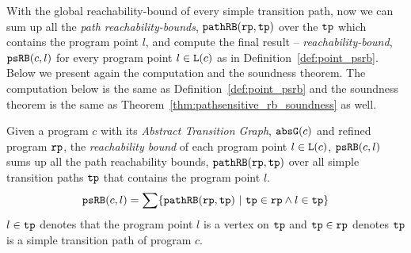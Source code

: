 With the global reachability-bound of every simple transition path, now we can sum up all the \emph{path reachability-bounds}, $\mathtt{pathRB}(\mathtt{rp}, \mathtt{tp})$ over the $\mathtt{tp}$ which contains the program point $l$, and compute the final result -- \emph{reachability-bound}, $\mathtt{psRB}(c, l)$ for every program point $l \in \mathtt{L}(c)$ as in Definition~\ref{def:point_psrb}.
Below we present again the computation and the soundness theorem.
The computation below is the same as Definition~\ref{def:point_psrb}
and the soundness theorem is the same as Theorem~\ref{thm:pathsensitive_rb_soundness} as well.
 \begin{definition}
  Given a program $c$ with its \emph{Abstract Transition Graph}, $\mathtt{abs}{\mathtt{G}}(c)$ and refined program $\mathtt{rp}$,
  the \emph{reachability bound} of each program point $l \in \mathtt{L}(c)$, $\mathtt{psRB}(c, l)$ 
  sums up all the path reachability bounds, $\mathtt{pathRB}(\mathtt{rp}, \mathtt{tp})$ over all simple transition paths $\mathtt{tp}$ that contains the program point $l$.
  \[ 
    \psRB(c, l) = 
    \sum
    \left\{ \inoutB(\rprog, \tpath) ~\vert~ \tpath \in \rprog \land 
    l \in \tpath \right\}
  \]
  $l \in \mathtt{tp}$ denotes that the program point $l$ is a vertex on $\mathtt{tp}$ 
  and $\mathtt{tp} \in \mathtt{rp}$ denotes $\mathtt{tp}$ is a simple transition path of program $c$.
 \end{definition}
